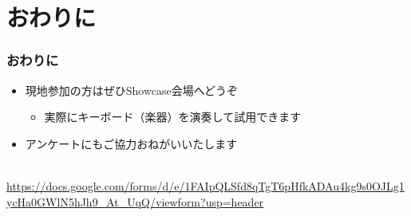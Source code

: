 \section*{おわりに}

\begin{frame}\frametitle{おわりに}
  \begin{itemize}
  \item 現地参加の方はぜひShowcase会場へどうぞ
    \begin{itemize}
    \item 実際にキーボード（楽器）を演奏して試用できます
    \end{itemize}
  \item アンケートにもご協力おねがいいたします
  \end{itemize}

  \centering
  \vspace{.5\zh}
   \\
  \vspace{.5\zh}
  \fontsize{6pt}{7pt}\selectfont%
  \url{https://docs.google.com/forms/d/e/1FAIpQLSfd8qTgT6pHfkADAu4kg9s0OJLg1ycHa0GWlN5hJh9_At_UqQ/viewform?usp=header}
\end{frame}


